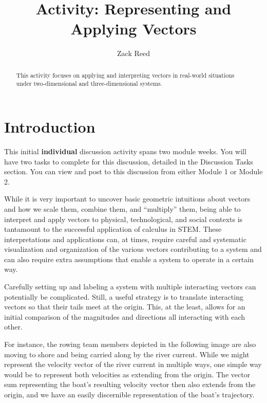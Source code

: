 \documentclass{ximera}
\title{Activity: Representing and Applying Vectors}
\author{Zack Reed}
\begin{document}
\begin{abstract}
This  activity focuses on applying and interpreting vectors in real-world situations under two-dimensional and three-dimensional systems.
\end{abstract}
\maketitle


\section*{Introduction}

This initial \textbf{individual} discussion activity spans two module weeks. You will have two tasks to complete for this discussion, detailed in the Discussion Tasks section. You can view and post to this discussion from either Module 1 or Module 2.

While it is very important to uncover basic geometric intuitions about vectors and how we scale them, combine them, and ``multiply'' them, being able to interpret and apply vectors to physical, technological, and social contexts is tantamount to the successful application of calculus in STEM. These interpretations and applications can, at times, require careful and systematic visualization and organization of the various vectors contributing to a system and can also require extra assumptions that enable a system to operate in a certain way.

Carefully setting up and labeling a system with multiple interacting vectors can potentially be complicated. Still, a useful strategy is to translate interacting vectors so that their tails meet at the origin. This, at the least, allows for an initial comparison of the magnitudes and directions all interacting with each other.

For instance, the rowing team members depicted in the following image are also moving to shore and being carried along by the river current. While we might represent the velocity vector of the river current in multiple ways, one simple way would be to represent both velocities as extending from the origin. The vector sum representing the boat's resulting velocity vector then also extends from the origin, and we have an easily discernible representation of the boat's trajectory.

\end{document}
